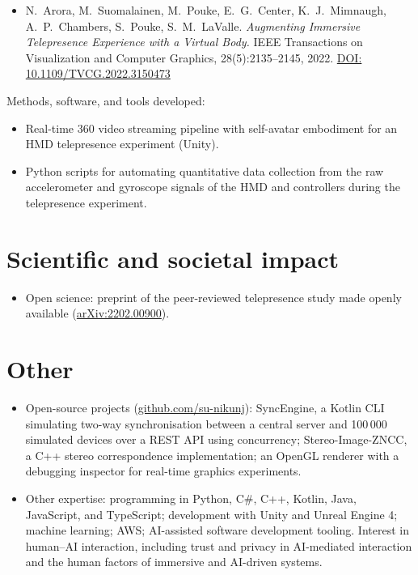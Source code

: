 \documentclass[a4paper,12pt]{article}
\begin{document}
\begin{itemize}
    \item N.~Arora, M.~Suomalainen, M.~Pouke, E.~G.~Center, K.~J.~Mimnaugh, A.~P.~Chambers, S.~Pouke, S.~M.~LaValle. \emph{Augmenting Immersive Telepresence Experience with a Virtual Body.} IEEE Transactions on Visualization and Computer Graphics, 28(5):2135--2145, 2022. \href{https://doi.org/10.1109/TVCG.2022.3150473}{DOI: 10.1109/TVCG.2022.3150473}
\end{itemize}

Methods, software, and tools developed:

\begin{itemize}
    \item Real-time 360\textdegree{} video streaming pipeline with self-avatar embodiment for an HMD telepresence experiment (Unity).
    \item Python scripts for automating quantitative data collection from the raw accelerometer and gyroscope signals of the HMD and controllers during the telepresence experiment.
\end{itemize}

\section*{Scientific and societal impact}

\begin{itemize}
    \item Open science: preprint of the peer-reviewed telepresence study made openly available (\href{https://arxiv.org/abs/2202.00900}{arXiv:2202.00900}).
\end{itemize}

\section*{Other}

\begin{itemize}
    \item Open-source projects (\href{https://github.com/su-nikunj}{github.com/su-nikunj}): SyncEngine, a Kotlin CLI simulating two-way synchronisation between a central server and 100\,000 simulated devices over a REST API using concurrency; Stereo-Image-ZNCC, a C++ stereo correspondence implementation; an OpenGL renderer with a debugging inspector for real-time graphics experiments.
    \item Other expertise: programming in Python, C\#, C++, Kotlin, Java, JavaScript, and TypeScript; development with Unity and Unreal Engine 4; machine learning; AWS; AI-assisted software development tooling. Interest in human--AI interaction, including trust and privacy in AI-mediated interaction and the human factors of immersive and AI-driven systems.
\end{itemize}

\label{lastpage}
\end{document}
